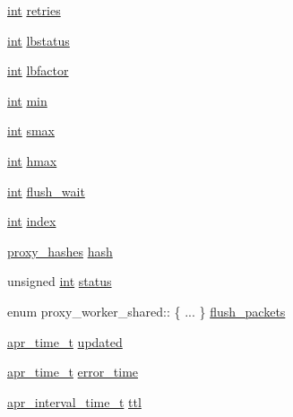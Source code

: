 \begin{DoxyCompactItemize}
\item 
\hyperlink{pcre_8txt_a42dfa4ff673c82d8efe7144098fbc198}{int} \hyperlink{structproxy__worker__shared_a734b2989e82cb44b69b0c433f7dfcff2}{retries}
\item 
\hyperlink{pcre_8txt_a42dfa4ff673c82d8efe7144098fbc198}{int} \hyperlink{structproxy__worker__shared_a8f5e9fb22d4a4ffd8553a7a162d5c392}{lbstatus}
\item 
\hyperlink{pcre_8txt_a42dfa4ff673c82d8efe7144098fbc198}{int} \hyperlink{structproxy__worker__shared_ac50bac603ed5780c4532b648fd3d4b07}{lbfactor}
\item 
\hyperlink{pcre_8txt_a42dfa4ff673c82d8efe7144098fbc198}{int} \hyperlink{structproxy__worker__shared_ae513fb822a1ea5a6dc2a31d0ad9046db}{min}
\item 
\hyperlink{pcre_8txt_a42dfa4ff673c82d8efe7144098fbc198}{int} \hyperlink{structproxy__worker__shared_a3ae4f96783e1f45e2126aa358b3d6685}{smax}
\item 
\hyperlink{pcre_8txt_a42dfa4ff673c82d8efe7144098fbc198}{int} \hyperlink{structproxy__worker__shared_a7c03c7a29e1fd3507ebee1c5f2f8249e}{hmax}
\item 
\hyperlink{pcre_8txt_a42dfa4ff673c82d8efe7144098fbc198}{int} \hyperlink{structproxy__worker__shared_a306a5fb867912b526cddea722cd7f012}{flush\+\_\+wait}
\item 
\hyperlink{pcre_8txt_a42dfa4ff673c82d8efe7144098fbc198}{int} \hyperlink{structproxy__worker__shared_a8c4bad7ffd3277d98f2e469696292671}{index}
\item 
\hyperlink{structproxy__hashes}{proxy\+\_\+hashes} \hyperlink{structproxy__worker__shared_aade40e2000e67a4cd33f6015336da649}{hash}
\item 
unsigned \hyperlink{pcre_8txt_a42dfa4ff673c82d8efe7144098fbc198}{int} \hyperlink{structproxy__worker__shared_a7e13e60d3b3d2c35f3a1a32c4ad10220}{status}
\item 
enum proxy\+\_\+worker\+\_\+shared\+:: \{ ... \}  \hyperlink{structproxy__worker__shared_a65b3570db2c8814acd7980979a039727}{flush\+\_\+packets}
\item 
\hyperlink{group__apr__time_gadb4bde16055748190eae190c55aa02bb}{apr\+\_\+time\+\_\+t} \hyperlink{structproxy__worker__shared_a265cad9ad9c23ea321536f675343a076}{updated}
\item 
\hyperlink{group__apr__time_gadb4bde16055748190eae190c55aa02bb}{apr\+\_\+time\+\_\+t} \hyperlink{structproxy__worker__shared_a425a0f5508f98939215771f29369549b}{error\+\_\+time}
\item 
\hyperlink{group__apr__time_gaae2129185a395cc393f76fabf4f43e47}{apr\+\_\+interval\+\_\+time\+\_\+t} \hyperlink{structproxy__worker__shared_a010c0f9eeb08efe37451b903824f3da0}{ttl}

\end{DoxyCompactItemize}
